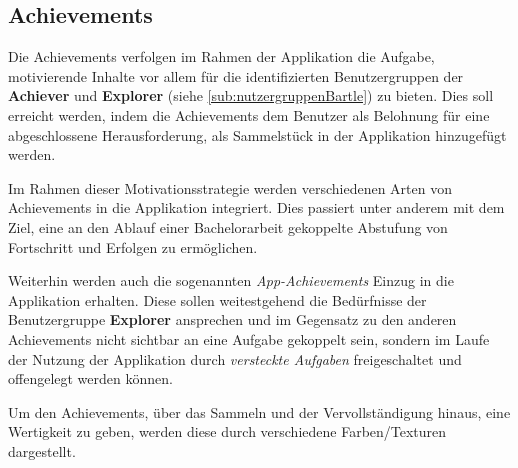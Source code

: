 \documentclass[bibliography=totoc,listof=totoc,BCOR=5mm,DIV=12,oneside]{scrbook}
\begin{document}
\subsection{Achievements} \label{sub:konzeptGamificationAchievements}
\par Die Achievements verfolgen im Rahmen der Applikation die Aufgabe, motivierende Inhalte vor allem für die identifizierten Benutzergruppen der \textbf{Achiever} und \textbf{Explorer} (siehe \ref{sub:nutzergruppenBartle}) zu bieten. Dies soll erreicht werden, indem die Achievements dem Benutzer als Belohnung für eine abgeschlossene Herausforderung, als Sammelstück in der Applikation hinzugefügt werden.
\par \medskip Im Rahmen dieser Motivationsstrategie werden verschiedenen Arten von Achievements in die Applikation integriert. Dies passiert unter anderem mit dem Ziel, eine an den Ablauf einer Bachelorarbeit gekoppelte Abstufung von Fortschritt und Erfolgen zu ermöglichen. 
\par Weiterhin werden auch die sogenannten \textit{App-Achievements} Einzug in die Applikation erhalten. Diese sollen weitestgehend die Bedürfnisse der Benutzergruppe \textbf{Explorer} ansprechen und im Gegensatz zu den anderen Achievements nicht sichtbar an eine Aufgabe gekoppelt sein, sondern im Laufe der Nutzung der Applikation durch \textit{versteckte Aufgaben} freigeschaltet und offengelegt werden können.

\par \medskip Um den Achievements, über das Sammeln und der Vervollständigung hinaus, eine Wertigkeit zu geben, werden diese durch verschiedene Farben/Texturen dargestellt. 
\end{document}
